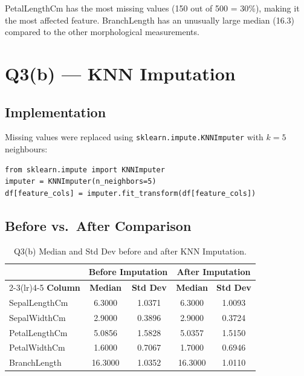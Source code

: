 \documentclass{article}
\begin{document}
PetalLengthCm has the most missing values (150 out of 500 = 30\%), making it the most affected feature. BranchLength has an unusually large median (16.3) compared to the other morphological measurements.

\newpage
\section{Q3(b) --- KNN Imputation}

\subsection{Implementation}

Missing values were replaced using \texttt{sklearn.impute.KNNImputer} with $k=5$ neighbours:

\begin{verbatim}
from sklearn.impute import KNNImputer
imputer = KNNImputer(n_neighbors=5)
df[feature_cols] = imputer.fit_transform(df[feature_cols])
\end{verbatim}

\subsection{Before vs.\ After Comparison}

\begin{table}[H]\centering
\begin{tabular}{lcccc}\toprule
 & \multicolumn{2}{c}{\textbf{Before Imputation}} & \multicolumn{2}{c}{\textbf{After Imputation}} \\
\cmidrule(lr){2-3}\cmidrule(lr){4-5}
\textbf{Column} & \textbf{Median} & \textbf{Std Dev} & \textbf{Median} & \textbf{Std Dev} \\\midrule
SepalLengthCm & 6.3000  & 1.0371 & 6.3000  & 1.0093 \\
SepalWidthCm  & 2.9000  & 0.3896 & 2.9000  & 0.3724 \\
PetalLengthCm & 5.0856  & 1.5828 & 5.0357  & 1.5150 \\
PetalWidthCm  & 1.6000  & 0.7067 & 1.7000  & 0.6946 \\
BranchLength  & 16.3000 & 1.0352 & 16.3000 & 1.0110 \\
\bottomrule\end{tabular}
\caption{Q3(b) Median and Std Dev before and after KNN Imputation.}
\end{table}
\end{document}
